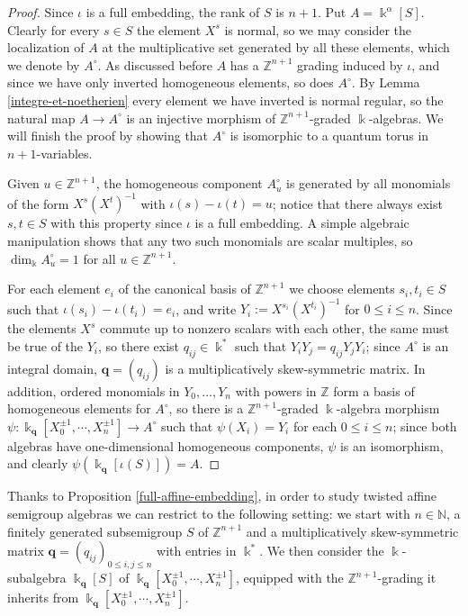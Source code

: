 \documentclass[twoside,11pt]{article}
\renewcommand{\k}{\Bbbk}
\newcommand{\N}{{\mathbb N}}
\newcommand{\Z}{{\mathbb Z}}
\newcommand{\q}{{\mathbf q}}
\begin{document}
\begin{proof} 
Since $\iota$ is a full embedding, the rank of $S$ is $n+1$. Put $A=\k^\alpha[S]$.
Clearly for every $s \in S$ the element $X^s$ is normal, so we may consider the
localization of $A$ at the multiplicative set generated by all these elements, which we
denote by $A^\circ$. As discussed before $A$ has a $\Z^{n+1}$ grading induced by $\iota$,
and since we have only inverted homogeneous elements, so does $A^\circ$. By Lemma
\ref{integre-et-noetherien} every element we have inverted is normal regular, so the
natural map $A \to A^\circ$ is an injective morphism of $\Z^{n+1}$-graded $\k$-algebras.
We will finish the proof by showing that $A^\circ$ is isomorphic to a quantum torus in
$n+1$-variables.

Given $u \in \Z^{n+1}$, the homogeneous component $A^\circ_u$ is generated by all
monomials of the form $X^s(X^t)^{-1}$ with $\iota(s) - \iota(t) = u$; notice that there
always exist $s,t \in S$ with this property since $\iota$ is a full embedding. A simple
algebraic manipulation shows that any two such monomials are scalar multiples, so $\dim_\k
A^\circ_u = 1$ for all $u \in \Z^{n+1}$.

For each element $e_i$ of the canonical basis of $\Z^{n+1}$ we choose elements $s_i, t_i
\in S$ such that $\iota(s_i)-\iota(t_i)=e_i$, and write $Y_i:= X^{s_i}(X^{t_i})^{-1}$ for
$0 \leq i \leq n$. Since the elements $X^s$ commute up to nonzero scalars with each other,
the same must be true of the $Y_i$, so there exist $q_{ij} \in\k^*$ such that $Y_i Y_j =
q_{ij} Y_j Y_i$; since $A^\circ$ is an integral domain, $\q = (q_{ij})$ is a
multiplicatively skew-symmetric matrix. In addition, ordered monomials in $Y_0,\dots,Y_n$
with powers in $\Z$ form a basis of homogeneous elements for $A^\circ$, so there is a
$\Z^{n+1}$-graded $\k$-algebra morphism $\psi: \k_\q[X_0^{\pm 1},\cdots,X_n^{\pm 1}] \to
A^\circ$ such that $\psi(X_i) = Y_i$ for each $0 \leq i \leq n$; since both algebras have
one-dimensional homogeneous components, $\psi$ is an isomorphism, and clearly
$\psi(\k_\q[\iota(S)]) = A$. \end{proof}

Thanks to Proposition \ref{full-affine-embedding}, in order to study twisted affine
semigroup algebras we can restrict to the following setting: we start with $n\in\N$, a
finitely generated subsemigroup $S$ of $\Z^{n+1}$
and a multiplicatively skew-symmetric matrix $\q=(q_{ij})_{0 \le i,j \le n}$ with entries
in $\k^*$. We then consider the $\k$-subalgebra $\k_\q[S]$ of $\k_\q[X_0^{\pm
1},\cdots,X_n^{\pm 1}]$, equipped with the $\Z^{n+1}$-grading it inherits from
$\k_\q[X_0^{\pm 1},\cdots,X_n^{\pm 1}]$.
\end{document}
